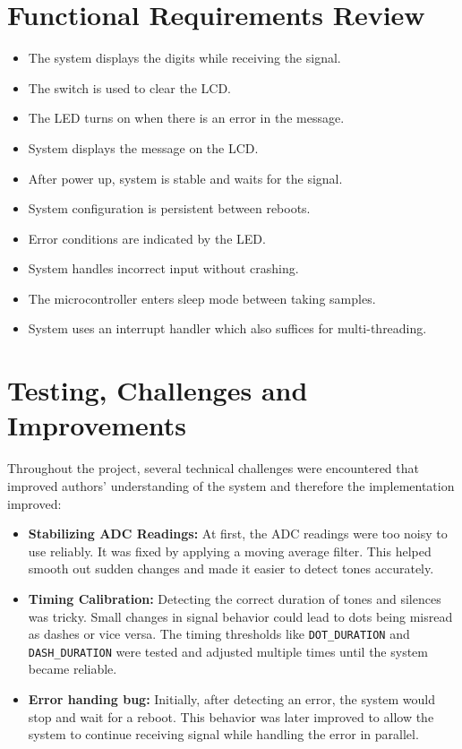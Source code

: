 \documentclass{article}
\begin{document}
\section{Functional Requirements Review}
\begin{itemize}
    \item The system displays the digits while receiving the signal.
    \item The switch is used to clear the LCD.
    \item The LED turns on when there is an error in the message.
    \item System displays the message on the LCD.
    \item After power up, system is stable and waits for the signal.
    \item System configuration is persistent between reboots.
    \item Error conditions are indicated by the LED.
    \item System handles incorrect input without crashing.
    \item The microcontroller enters sleep mode between taking samples.
    \item System uses an interrupt handler which also suffices for multi-threading.
\end{itemize}


\section{Testing, Challenges and Improvements}
Throughout the project, several technical challenges were encountered that improved authors'
understanding of the system and therefore the implementation improved:

\begin{itemize}

     
    \item \textbf{Stabilizing ADC Readings:} At first, the ADC readings were too noisy to use reliably. 
    It was fixed by applying a moving average filter. This helped smooth out sudden changes 
    and made it easier to detect tones accurately.

    
    \item \textbf{Timing Calibration:} Detecting the correct duration of tones and silences was tricky. 
    Small changes in signal behavior could lead to dots being misread as dashes or vice versa. 
    The timing thresholds like \texttt{DOT\_DURATION} and \texttt{DASH\_DURATION}  were tested and adjusted
    multiple times until the system became reliable.
    
    \item \textbf{Error handing bug:} Initially, after detecting an error, the system would stop and wait for a reboot.
    This behavior was later improved to allow the system to continue receiving signal 
    while handling the error in parallel.  

      
\end{itemize}
\end{document}
